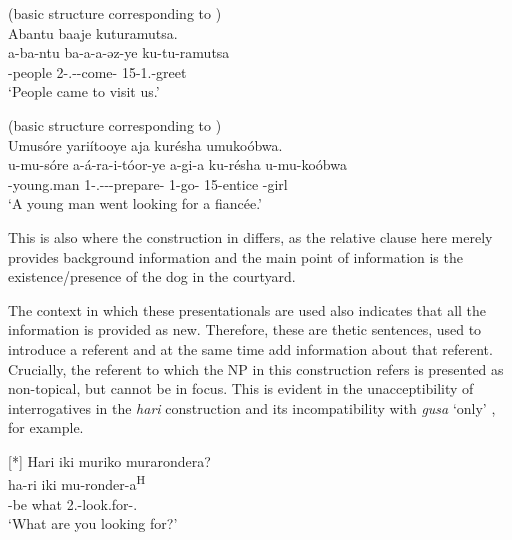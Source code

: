 \documentclass[output=paper]{langscibook}
\begin{document}
\ea
\label{bkm:Ref75262552}
(basic structure corresponding to )\\
Abantu baaje kuturamutsa.\\
\gll
a-ba-ntu  ba-a-a-əz-ye  ku-tu-ramutsa\\
-{}people  2\SM-\N.\PST-\DJ-{}come-\PFV{}  15-1\PL.\OM{}-greet\\
\glt
‘People came to visit us.’\\

\z

\ea
\label{bkm:Ref75262560}
(basic structure corresponding to )\\
Umusóre yariítooye aja kurésha umukoóbwa.\\
\gll
u-mu-sóre  a-á-ra-i-tóor-ye  a-gi-a  ku-résha   u-mu-koóbwa \\
-{}young.man  1\SM-\RMT.\PST-\DJ-\REFL{}-prepare-\PFV{}  {}1\SM{}-{}go-\FV{}  {}15-{}entice   -{}girl \\
\glt
  ‘A young man went looking for a fiancée.’\\

\z

This is also where the construction in  differs, as the relative clause here merely provides background information and the main point of information is the existence/presence of the dog in the courtyard.

  The context in which these presentationals are used also indicates that all the information is provided as new. Therefore, these are thetic sentences, used to introduce a referent and at the same time add information about that referent. Crucially, the referent to which the NP in this construction refers is presented as non-topical, but cannot be in focus. This is evident in the unacceptibility of interrogatives in the \textit{hari} construction  and its incompatibility with \textit{gusa} ‘only’ , for example.

\ea
[*]{
\label{bkm:Ref74740077}
Hari iki muriko murarondera?\\
\gll
ha-ri  iki  mu-ronder-a\textsuperscript{H}\\
\EXP{}-be  what  2\PL.\SM{}-look.for-\FV.\REL{}\\
\glt
‘What are you looking for?’\\
}
\end{document}
